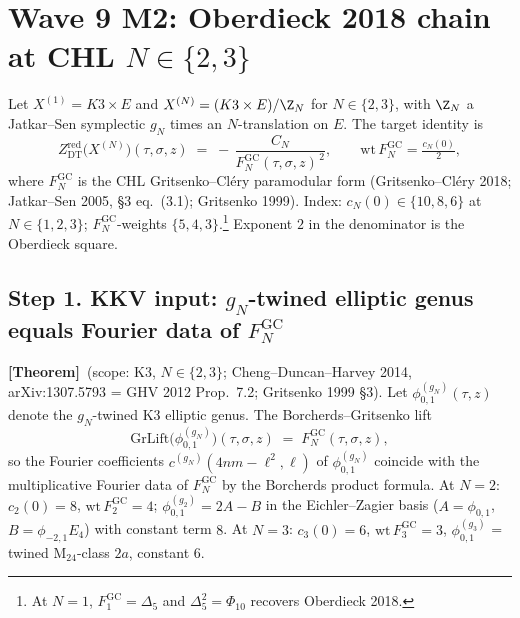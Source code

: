 %
%
%
\providecommand{\ClaimStatusTheorem}{\textbf{[Theorem]}}
\providecommand{\ClaimStatusConjectured}{\textbf{[Conjecture]}}
\providecommand{\ClaimStatusAxiomatic}{\textbf{[Axiomatic input]}}
\providecommand{\kappaBKM}{\kappa_{\mathrm{BKM}}}
\providecommand{\kappach}{\kappa_{\mathrm{ch}}}
\providecommand{\kappacat}{\kappa_{\mathrm{cat}}}
\providecommand{\kappafib}{\kappa_{\mathrm{fiber}}}
\providecommand{\Fgc}{F^{\mathrm{GC}}}
\providecommand{\ZredDT}{Z^{\mathrm{red}}_{\mathrm{DT}}}
\providecommand{\ZredPT}{Z^{\mathrm{red}}_{\mathrm{PT}}}
\providecommand{\Sp}{\mathrm{Sp}}

\section*{Wave 9 M2: Oberdieck 2018 chain at CHL $N \in \{2,3\}$}

Let $X^{(1)} = K3 \times E$ and $X^{(N)} = (K3 \times E)/\Z_N$ for
$N \in \{2,3\}$, with $\Z_N$ a Jatkar--Sen symplectic $g_N$ times an
$N$-translation on $E$. The target identity is
\[
  \ZredDT\bigl(X^{(N)}\bigr)(\tau,\sigma,z) \;=\; -\,\frac{C_N}{\Fgc_N(\tau,\sigma,z)^{\,2}},
  \qquad \mathrm{wt}\,\Fgc_N = \tfrac{c_N(0)}{2},
\]
where $\Fgc_N$ is the CHL Gritsenko--Cl\'ery paramodular form
(Gritsenko--Cl\'ery 2018; Jatkar--Sen 2005, \S 3 eq.~(3.1);
Gritsenko 1999). Index: $c_N(0) \in \{10,8,6\}$ at $N \in \{1,2,3\}$;
$\Fgc_N$-weights $\{5,4,3\}$.\footnote{At $N=1$, $\Fgc_1 = \Delta_5$
and $\Delta_5^2 = \Phi_{10}$ recovers Oberdieck 2018.} Exponent $2$ in
the denominator is the Oberdieck square.

\subsection*{Step 1. KKV input: $g_N$-twined elliptic genus equals
Fourier data of $\Fgc_N$}

\ClaimStatusTheorem\ (scope: K3, $N \in \{2,3\}$; Cheng--Duncan--Harvey
2014, arXiv:1307.5793 = GHV 2012 Prop.~7.2; Gritsenko 1999 \S 3).
Let $\phi^{(g_N)}_{0,1}(\tau,z)$ denote the $g_N$-twined K3 elliptic
genus. The Borcherds--Gritsenko lift
\[
  \mathrm{GrLift}\bigl(\phi^{(g_N)}_{0,1}\bigr)(\tau,\sigma,z)
  \;=\; \Fgc_N(\tau,\sigma,z),
\]
so the Fourier coefficients $c^{(g_N)}(4nm - \ell^2, \ell)$ of
$\phi^{(g_N)}_{0,1}$ coincide with the multiplicative Fourier data of
$\Fgc_N$ by the Borcherds product formula. At $N=2$: $c_2(0) = 8$,
$\mathrm{wt}\,\Fgc_2 = 4$; $\phi^{(g_2)}_{0,1} = 2A - B$ in the
Eichler--Zagier basis ($A = \phi_{0,1}$, $B = \phi_{-2,1}E_4$) with
constant term $8$. At $N=3$: $c_3(0) = 6$, $\mathrm{wt}\,\Fgc_3 = 3$,
$\phi^{(g_3)}_{0,1}$ = twined M$_{24}$-class $2a$, constant $6$.

